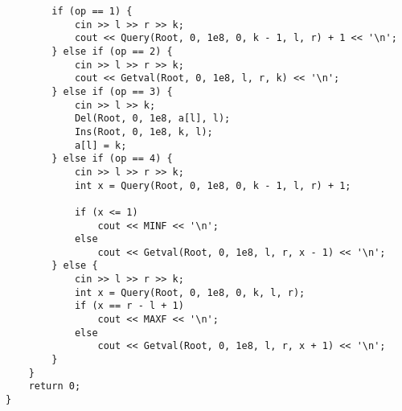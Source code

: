 \begin{verbatim}
        if (op == 1) {
            cin >> l >> r >> k;
            cout << Query(Root, 0, 1e8, 0, k - 1, l, r) + 1 << '\n';
        } else if (op == 2) {
            cin >> l >> r >> k;
            cout << Getval(Root, 0, 1e8, l, r, k) << '\n';
        } else if (op == 3) {
            cin >> l >> k;
            Del(Root, 0, 1e8, a[l], l);
            Ins(Root, 0, 1e8, k, l);
            a[l] = k;
        } else if (op == 4) {
            cin >> l >> r >> k;
            int x = Query(Root, 0, 1e8, 0, k - 1, l, r) + 1;

            if (x <= 1)
                cout << MINF << '\n';
            else
                cout << Getval(Root, 0, 1e8, l, r, x - 1) << '\n';
        } else {
            cin >> l >> r >> k;
            int x = Query(Root, 0, 1e8, 0, k, l, r);
            if (x == r - l + 1)
                cout << MAXF << '\n';
            else
                cout << Getval(Root, 0, 1e8, l, r, x + 1) << '\n';
        }
    }
    return 0;
}
\end{verbatim}